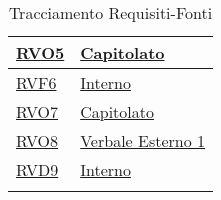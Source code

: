 \begin{longtable}{|>{\centering}m{5cm}|m{5cm}<{\centering}|}
\hyperlink{RVO5}{RVO5} & \hyperlink{Capitolato}{Capitolato}\\ \hline

\hyperlink{RVF6}{RVF6} & \hyperlink{Interno}{Interno}\\ \hline

\hyperlink{RVO7}{RVO7} & \hyperlink{Capitolato}{Capitolato}\\ \hline

\hyperlink{RVO8}{RVO8} & \hyperlink{Verbale Esterno 1}{Verbale Esterno 1}\\ \hline

\hyperlink{RVD9}{RVD9} & \hyperlink{Interno}{Interno}\\ \hline

\caption[Tracciamento Requisiti-Fonti]{Tracciamento Requisiti-Fonti}
\label{tabella:requi-fonti}
\end{longtable}
\clearpage
